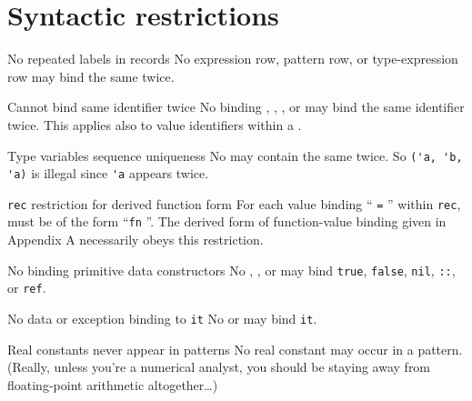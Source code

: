 \section{Syntactic restrictions}

\begin{clause}{No repeated labels in records}
No expression row, pattern row, or type-expression row may bind the same
 twice.
\end{clause}

\begin{clause}{Cannot bind same identifier twice}
No binding , , , or  may bind the
same identifier twice. This applies also to value identifiers within a
. 
\end{clause}

\begin{clause}{Type variables sequence uniqueness}
No  may contain the same  twice. So \verb|('a, 'b, 'a)|
is illegal since \verb|'a| appears twice.
\end{clause}

\begin{clause}{\texttt{rec} restriction for derived function form}
For each value binding `` \texttt{=} '' within \texttt{rec},
 must be of the form ``\texttt{fn} ''. The derived form of
function-value binding given in Appendix A necessarily obeys this restriction.
\end{clause}

\begin{clause}{No binding primitive data constructors}
No , , or  may bind \texttt{true},
\texttt{false}, \texttt{nil}, \texttt{::}, or \texttt{ref}.
\end{clause}

\begin{clause}{No data or exception binding to \texttt{it}}
No  or  may bind \texttt{it}.
\end{clause}

\begin{clause}{Real constants never appear in patterns}
No real constant may occur in a pattern. (Really, unless you're a
numerical analyst, you should be staying away from floating-point
arithmetic altogether\dots)
\end{clause}

